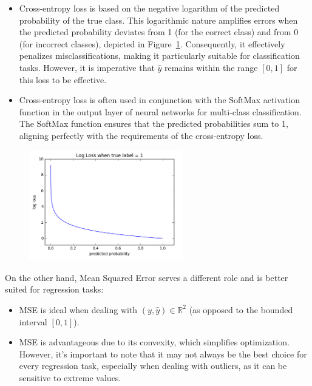 \documentclass{article}
\theoremstyle{plain}%
\theoremstyle{definition}
\theoremstyle{remark}
\begin{document}
\begin{itemize}
    \item Cross-entropy loss is based on the negative logarithm of the predicted probability of the true class. This logarithmic nature amplifies errors when the predicted probability deviates from 1 (for the correct class) and from 0 (for incorrect classes), depicted in Figure~\ref{CELoss}. Consequently, it effectively penalizes misclassifications, making it particularly suitable for classification tasks. However, it is imperative that $\hat{y}$ remains within the range $[0, 1]$ for this loss to be effective.
    \item Cross-entropy loss is often used in conjunction with the SoftMax activation function in the output layer of neural networks for multi-class classification. The SoftMax function ensures that the predicted probabilities sum to 1, aligning perfectly with the requirements of the cross-entropy loss.
\end{itemize}

\begin{figure}[!htbp]
    \centering
    \includegraphics*[width=0.6\textwidth]{figs/cross_entropy.png}
    \label{CELoss}
\end{figure}

On the other hand, Mean Squared Error serves a different role and is better suited for regression tasks:

\begin{itemize}
    \item MSE is ideal when dealing with $(y, \hat{y}) \in \mathbb{R}^2$ (as opposed to the bounded interval $[0, 1]$).
    \item MSE is advantageous due to its convexity, which simplifies optimization. However, it's important to note that it may not always be the best choice for every regression task, especially when dealing with outliers, as it can be sensitive to extreme values.
\end{itemize}
\end{document}
